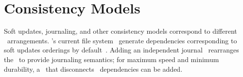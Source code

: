 \section{Consistency Models}
\label{sec:using}

Soft updates, journaling, and other consistency models
correspond to different \chdesc\ arrangements.
%
\Kudos's current file system \modules\ generate dependencies corresponding
to soft updates orderings by default~\cite{ganger00soft}.
%
Adding an independent journal \module\ rearranges the \chdescs\ to provide
journaling semantics;
%
for maximum speed and minimum durability, a \module\ that disconnects
\chdesc\ dependencies can be added.
%




